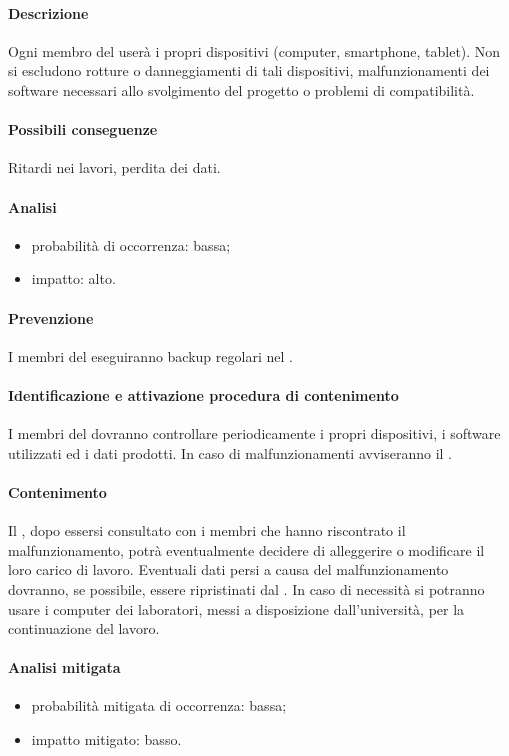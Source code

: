 			\paragraph{Descrizione} Ogni membro del  userà i propri dispositivi (computer, smartphone, tablet). Non si escludono rotture o danneggiamenti di tali dispositivi, malfunzionamenti dei software necessari allo svolgimento del progetto o problemi di compatibilità.
			\paragraph{Possibili conseguenze} Ritardi nei lavori, perdita dei dati.
			\paragraph{Analisi}
			\begin{itemize}
			\item{probabilità di occorrenza:} bassa;
			\item{impatto:} alto.
			\end{itemize}
			\paragraph{Prevenzione} I membri del  eseguiranno backup regolari nel .
			\paragraph{Identificazione e attivazione procedura di contenimento}
			I membri del  dovranno controllare periodicamente i propri dispositivi, i software utilizzati ed i dati prodotti. In caso di malfunzionamenti avviseranno il \responsabilediprogetto.
			\paragraph{Contenimento}
			Il \responsabilediprogetto, dopo essersi consultato con i membri che hanno riscontrato il malfunzionamento, potrà eventualmente decidere di alleggerire o modificare il loro carico di lavoro. Eventuali dati persi a causa del malfunzionamento dovranno, se possibile, essere ripristinati dal . In caso di necessità si potranno usare i computer dei laboratori, messi a disposizione dall'università, per la continuazione del lavoro.
			\paragraph{Analisi mitigata}
			\begin{itemize}
			\item{probabilità mitigata di occorrenza:} bassa;
			\item{impatto mitigato:} basso.
			\end{itemize}
